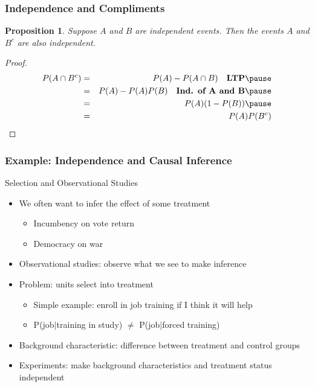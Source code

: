 \documentclass[aspectratio=169]{beamer}
\newtheorem{prop}{Proposition}
\numberwithin{equation}{section}
\begin{document}
\begin{frame}
\frametitle{Independence and Compliments}

\begin{prop}
Suppose $A$ and $B$ are independent events. Then the events $A$ and $B^{c}$ are also independent.  
\end{prop}

\pause 

\begin{proof}
\begin{eqnarray}
P(A \cap B^{c} ) & = & P(A) - P(A \cap B)  \quad \textbf{LTP}\nonumber  \pause \\
& = & P(A)  - P(A) P(B)  \quad \textbf{Ind. of A and B} \nonumber  \pause \\
& = & P(A) ( 1- P(B) )  \pause \nonumber \\
& = & P(A) P(B^{c})   \nonumber 
\end{eqnarray}
\end{proof}



\end{frame}


\begin{frame}
\frametitle{Example: Independence and Causal Inference} 

Selection and Observational Studies
\begin{itemize}
\item[-] We often want to infer the effect of some treatment 
\begin{itemize}
\item[-] Incumbency on vote return 
\item[-] Democracy on war
\end{itemize}
\item[-] Observational studies: observe what we see to make inference 
\item[-] Problem: units select into treatment 
\begin{itemize}
\item[-] Simple example: enroll in job training if I think it will help 
\item[-] P(job$|$training in study) $\neq$ P(job$|$forced training) 
\end{itemize}
\item[-] \alert{Background characteristic}: difference between
  treatment and control groups
\item[-] \alert{Experiments}: make background characteristics and treatment status
  independent 
\end{itemize}


\end{frame}
\end{document}
